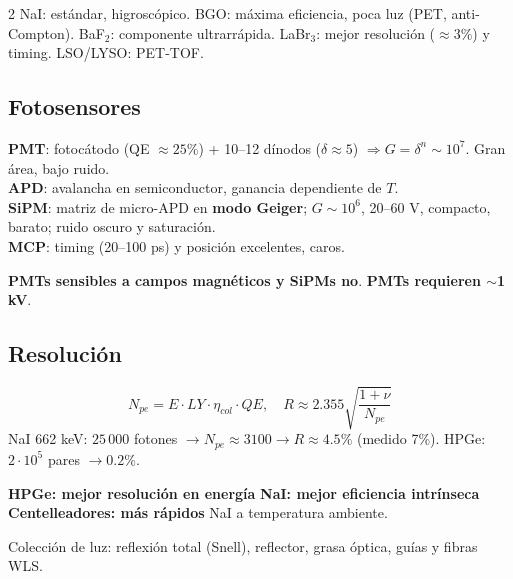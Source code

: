 \documentclass[10pt,a4paper]{article}
\newcommand{\imp}[1]{\textbf{\color{BrickRed}#1}}
\begin{document}
\begin{multicols}{2}
NaI: estándar, higroscópico. BGO: máxima eficiencia, poca luz (PET, anti-Compton). BaF$_2$: componente ultrarrápida. LaBr$_3$: mejor resolución ($\approx3\%$) y timing. LSO/LYSO: PET-TOF.
\columnbreak
\subsection{Fotosensores}
\textbf{PMT}: fotocátodo (QE $\approx25\%$) + 10--12 dínodos ($\delta\approx5$) $\Rightarrow G=\delta^n\sim10^7$. Gran área, bajo ruido.\\
\textbf{APD}: avalancha en semiconductor, ganancia dependiente de $T$.\\
\textbf{SiPM}: matriz de micro-APD en \textbf{modo Geiger}; $G\sim10^6$, 20--60 V, compacto, barato; ruido oscuro y saturación.\\
\textbf{MCP}: timing (20--100 ps) y posición excelentes, caros.
\begin{clave}
\imp{PMTs sensibles a campos magnéticos y SiPMs no}. \imp{PMTs requieren $\sim$1 kV}.
\end{clave}
\subsection{Resolución}
\[ N_{pe}=E\cdot LY\cdot\eta_{col}\cdot QE,\quad R\approx2.355\sqrt{\frac{1+\nu}{N_{pe}}} \]
NaI 662 keV: $25\,000$ fotones $\to N_{pe}\approx3100\to R\approx4.5\%$ (medido 7\%). HPGe: $2\cdot10^5$ pares $\to0.2\%$.
\begin{clave}
\imp{HPGe: mejor resolución en energía} \textperiodcentered{} \imp{NaI: mejor eficiencia intrínseca} \textperiodcentered{} \imp{Centelleadores: más rápidos} \textperiodcentered{} NaI a temperatura ambiente.
\end{clave}
Colección de luz: reflexión total (Snell), reflector, grasa óptica, guías y fibras WLS.
\end{multicols}
\newpage

\end{document}
